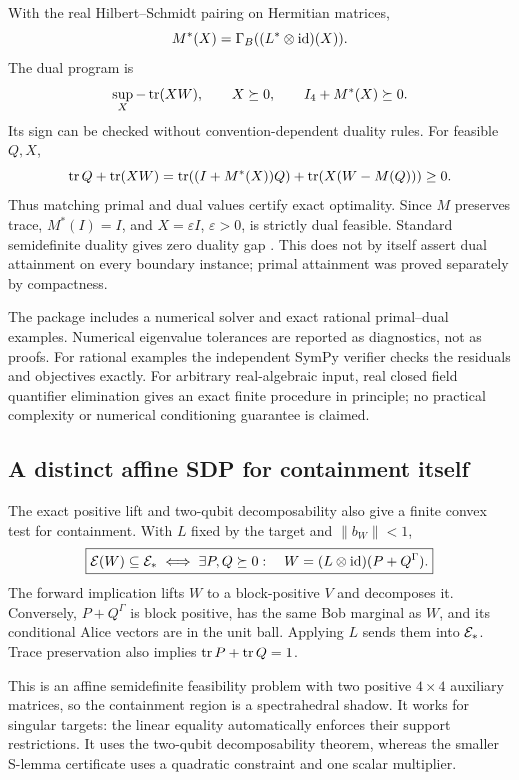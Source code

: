 With the real Hilbert--Schmidt pairing on Hermitian matrices,
\[
 M^*(X)=\Gamma_B((L^*\otimes\operatorname{id})(X)).
\]
The dual program is
\begin{equation}\label{eq:sdp-dual}
 \sup_X-\operatorname{tr}(XW),\qquad X\succeq0,\qquad I_4+M^*(X)\succeq0.
\end{equation}
Its sign can be checked without convention-dependent duality rules. For feasible $Q,X$,
\begin{equation}\label{eq:duality-gap}
 \operatorname{tr} Q+\operatorname{tr}(XW)
 =\operatorname{tr}((I+M^*(X))Q)+\operatorname{tr}(X(W-M(Q)))\geq0.
\end{equation}
Thus matching primal and dual values certify exact optimality. Since $M$ preserves trace, $M^*(I)=I$, and $X=\varepsilon I$, $\varepsilon>0$, is strictly dual feasible. Standard semidefinite duality gives zero duality gap \cite{boyd}. This does not by itself assert dual attainment on every boundary instance; primal attainment was proved separately by compactness.

The package includes a numerical solver and exact rational primal--dual examples. Numerical eigenvalue tolerances are reported as diagnostics, not as proofs. For rational examples the independent SymPy verifier checks the residuals and objectives exactly. For arbitrary real-algebraic input, real closed field quantifier elimination gives an exact finite procedure in principle; no practical complexity or numerical conditioning guarantee is claimed.

\subsection{A distinct affine SDP for containment itself}

The exact positive lift and two-qubit decomposability also give a finite convex test for containment. With $L$ fixed by the target and $\|b_W\|<1$,
\begin{equation}\label{eq:containment-sdp}
 \boxed{\mathcal E(W)\subseteq\mathcal E_*
 \iff \exists P,Q\succeq0:\quad
 W=(L\otimes\operatorname{id})(P+Q^\Gamma).}
\end{equation}
The forward implication lifts $W$ to a block-positive $V$ and decomposes it. Conversely, $P+Q^\Gamma$ is block positive, has the same Bob marginal as $W$, and its conditional Alice vectors are in the unit ball. Applying $L$ sends them into $\mathcal E_*$. Trace preservation also implies $\operatorname{tr} P+\operatorname{tr} Q=1$.

This is an affine semidefinite feasibility problem with two positive $4\times4$ auxiliary matrices, so the containment region is a spectrahedral shadow. It works for singular targets: the linear equality automatically enforces their support restrictions. It uses the two-qubit decomposability theorem, whereas the smaller S-lemma certificate uses a quadratic constraint and one scalar multiplier.

